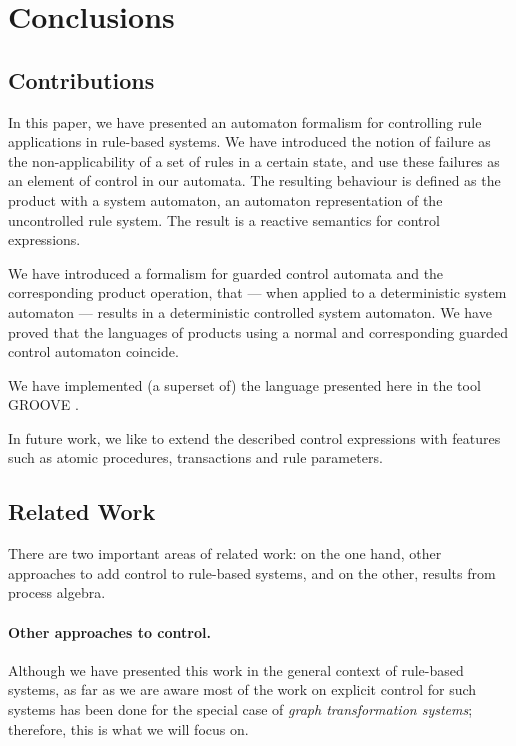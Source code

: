 \section{Conclusions}\label{sec:conclusion}

\subsection{Contributions}
In this paper, we have presented an automaton formalism for controlling rule applications in rule-based systems. We have introduced the notion of failure as the non-applicability of a set of rules in a certain state, and use these failures as an element of control in our automata. The resulting behaviour is defined as the product with a system automaton, an automaton representation of the uncontrolled rule system. The result is a reactive semantics for control expressions. 


We have introduced a formalism for guarded control automata and the corresponding product operation, that --- when applied to a deterministic system automaton --- results in a deterministic controlled system automaton. We have proved that the languages of products using a normal and corresponding guarded control automaton coincide.

We have implemented (a superset of) the language presented here in the tool GROOVE \cite{GROOVE}. 

In future work, we like to extend the described control expressions with features such as atomic procedures, transactions and rule parameters.

\subsection{Related Work}

There are two important areas of related work: on the one hand, other
approaches to add control to rule-based systems, and on the other, results from
process algebra.

\paragraph{Other approaches to control.}

Although we have presented this work in the general context of rule-based
systems, as far as we are aware most of the work on explicit control for such
systems has been done for the special case of \emph{graph transformation
systems}; therefore, this is what we will focus on.

